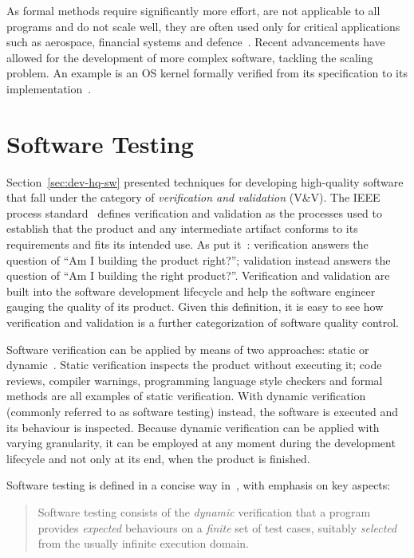 As formal methods require significantly more effort, are not applicable to all
programs and do not scale well, they are often used only for critical
applications such as aerospace, financial systems and
defence~\cite{Woodcock2009FMP}. Recent advancements have allowed for the
development of more complex software, tackling the scaling problem. An example
is an \ac{OS} kernel formally verified from its specification to its
implementation~\cite{Klein2009SFV}.

\section{Software Testing}
Section~\ref{sec:dev-hq-sw} presented techniques for developing high-quality
software that fall under the category of \emph{verification and validation}
(V\&V). The IEEE process standard~\cite{8055462} defines verification and
validation as the processes used to establish that the product and any
intermediate artifact conforms to its requirements and fits its intended use.
As \citeauthor{boehm1984verifying} put it~\cite{boehm1984verifying}:
verification answers the question of ``Am I building the product right?'';
validation instead answers the question of ``Am I building the right product?''.
Verification and validation are built into the software development lifecycle
and help the software engineer gauging the quality of its product. Given this
definition, it is easy to see how verification and validation is a further
categorization of software quality control.

Software verification can be applied by means of two approaches: static or
dynamic~\cite{ghezzi2002fundamentals}. Static verification inspects the product
without executing it; code reviews, compiler warnings, programming language
style checkers and formal methods are all examples of static verification. With
dynamic verification (commonly referred to as software testing) instead, the
software is executed and its behaviour is inspected. Because dynamic
verification can be applied with varying granularity, it can be employed at any
moment during the development lifecycle and not only at its end, when the
product is finished.

Software testing is defined in a concise way in~\cite{IEEE2014GSEBK}, with
emphasis on key aspects:

\begin{quote}
    Software testing consists of the \emph{dynamic} verification that a program
    provides \emph{expected} behaviours on a \emph{finite} set of test cases,
    suitably \emph{selected} from the usually infinite execution domain.
\end{quote}

